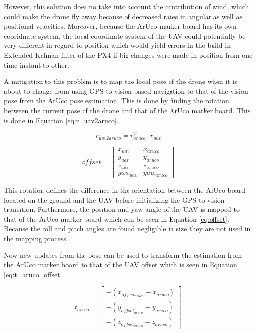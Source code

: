 \documentclass[../Head/report.tex]{subfiles}
\begin{document}
However, this  solution does no take into account the contribution of wind, which could make the drone fly away because of decreased rates in angular as well as positional velocities. Moreover, because the ArUco marker board has its own cooridnate system, the local coordinate system of the UAV could potentially be very different in regard to position which would yield errors in the build in Extended Kalman filter of the PX4 if big changes were made in position from one time instant to other.    

A mitigation to this problem is to map the local pose of the drone when it is about to change from using GPS to vision based navigation to that of the vision pose from the ArUco pose estimation. This is done by finding the rotation between the current pose of the drone and that of the ArUco marker board. This is done in Equation \ref{eq:r_uav2aruco}.

\begin{equation}
	r_{uav2aruco} = r_{aruco}^T \cdot r_{uav}
	\label{eq:r_uav2aruco}
\end{equation}

\begin{equation}
	offset = \begin{bmatrix}
						  x_{uav} & x_{aruco}\\
						  y_{uav} & y_{aruco}\\
						  z_{uav} & z_{aruco}\\
						  yaw_{uav} & yaw_{aruco}
					     \end{bmatrix}
\label{eq:offset}
\end{equation}

This rotation defines the difference in the orientation between the ArUco board located on the ground and the UAV before initializing the GPS to vision transition. Furthermore, the position and yaw angle of the UAV is mapped to that of the ArUco marker board which can be seen in Equation \ref{eq:offset}. Because the roll and pitch angles are found negligible in size they are not used in the mapping process. 

Now new updates from the pose can be used to transform the estimation from the ArUco marker board to that of the UAV offset which is seen in Equation \ref{eq:t_aruco_offset}.     

\begin{equation}
	t_{aruco} = \begin{bmatrix}
			   -(x_{offset_{aruco}} - x_{aruco})\\
			   -(y_{offset_{aruco}} - y_{aruco})\\
			   -(z_{offset_{aruco}} - z_{aruco})
			   \end{bmatrix}
\label{eq:t_aruco_offset}
\end{equation}
\end{document}
